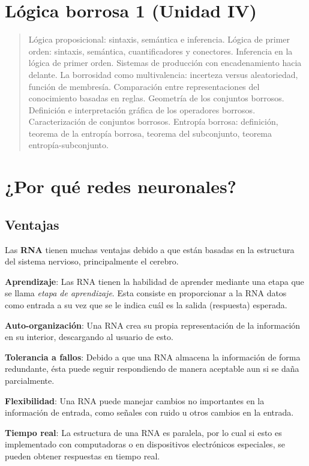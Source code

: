 \documentclass[10pt,a4paper]{article}
\begin{document}
\section*{Lógica borrosa 1 (Unidad IV)}
\begin{quote}
Lógica proposicional: sintaxis, semántica e inferencia. Lógica de primer orden: sintaxis, semántica, cuantificadores y conectores. Inferencia en la lógica de primer orden. Sistemas de producción con encadenamiento hacia delante. La borrosidad como multivalencia: incerteza versus aleatoriedad,  función de membresía. Comparación entre representaciones del conocimiento basadas en reglas. Geometría de los conjuntos borrosos. Definición e interpretación gráfica de los operadores borrosos. Caracterización de conjuntos borrosos. Entropía borrosa: definición, teorema de la entropía borrosa, teorema del subconjunto, teorema entropía-subconjunto.
\end{quote}

\pagebreak

\section{¿Por qué redes neuronales?}

\subsection{Ventajas}
Las \textbf{RNA} tienen muchas ventajas debido a que están basadas en la estructura del sistema nervioso, principalmente el cerebro.
\begin{description}
\item \textbf{Aprendizaje}: Las RNA tienen la habilidad de aprender mediante una etapa que se llama \textit{etapa de aprendizaje}. Esta consiste en proporcionar a la RNA datos como entrada a su vez que se le indica cuál es la salida (respuesta) esperada.
\item \textbf{Auto-organización}: Una RNA crea su propia representación de la información en su interior, descargando al usuario de esto.
\item \textbf{Tolerancia a fallos}: Debido a que una RNA almacena la información de forma redundante, ésta puede seguir respondiendo de manera aceptable aun si se daña parcialmente.
\item \textbf{Flexibilidad}: Una RNA puede manejar cambios no importantes en la información de entrada, como señales con ruido u otros cambios en la entrada.
\item \textbf{Tiempo real}: La estructura de una RNA es paralela, por lo cual si esto es implementado con computadoras o en dispositivos electrónicos especiales, se pueden obtener respuestas en tiempo real.
\end{description}
\end{document}
